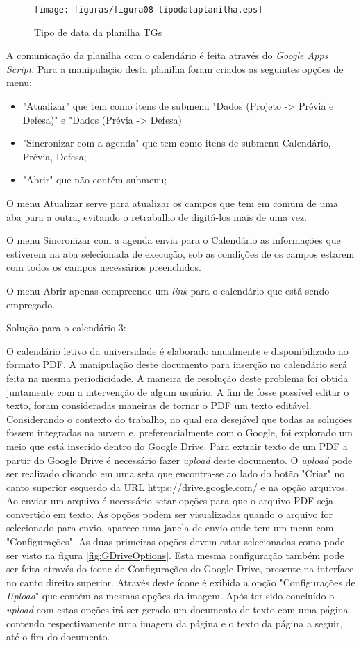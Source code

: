 \begin{figure}[hbtn]
   \centering
   \texttt{[image: figuras/figura08-tipodataplanilha.eps]}
   \caption{Tipo de data da planilha TGs}
   \label{fig:PlanilhaData}
\end{figure} 

A comunicação da planilha com o calendário é feita através do \emph{Google Apps Script}. Para a manipulação desta planilha foram criados as seguintes opções de menu: 

\begin{itemize}
\item "Atualizar" que tem como itens de submenu "Dados (Projeto -> Prévia e Defesa)" e "Dados (Prévia -> Defesa)
\item "Sincronizar com a agenda" que tem como itens de submenu Calendário, Prévia, Defesa;
\item "Abrir" que não contém submenu;
\end{itemize}

O menu Atualizar serve para atualizar os campos que tem em comum de uma aba para a outra, evitando o retrabalho de digitá-los mais de uma vez.

O menu Sincronizar com a agenda envia para o Calendário as informações que estiverem na aba selecionada de execução, sob as condições de os campos estarem com todos os campos necessários preenchidos.

O menu Abrir apenas compreende um \emph{link} para o calendário que está sendo empregado.

Solução para o calendário 3:

O calendário letivo da universidade é elaborado anualmente e disponibilizado no formato PDF.  A manipulação deste documento para inserção no calendário será feita na mesma periodicidade. A maneira de resolução deste problema foi obtida juntamente com a intervenção de algum usuário. A fim de fosse possível editar o texto, foram consideradas maneiras de tornar o PDF um texto editável. Considerando o contexto do trabalho, no qual era desejável que todas as soluções fossem integradas na nuvem e, preferencialmente com o Google, foi explorado um meio que está inserido dentro do Google Drive. Para extrair texto de um PDF a partir do Google Drive é necessário fazer \emph{upload} deste documento. O \emph{upload} pode ser realizado clicando em uma seta que encontra-se ao lado do botão "Criar" no canto superior esquerdo da URL https://drive.google.com/ e na opção arquivos. Ao enviar um arquivo é necessário setar opções para que o arquivo PDF seja convertido em texto. As opções podem ser visualizadas quando o arquivo for selecionado para envio, aparece uma janela de envio onde tem um menu com "Configurações". As duas primeiras opções devem estar selecionadas como pode ser visto na figura \ref{fig:GDriveOptions}. Esta mesma configuração também pode ser feita através do ícone de Configurações do Google Drive, presente na interface no canto direito superior. Através deste ícone é exibida a opção "Configurações de \emph{Upload}" que contém as mesmas opções da imagem. Após ter sido concluído o \emph{upload} com estas opções irá ser gerado um documento de texto com uma página contendo respectivamente uma imagem da página e o texto da página a seguir, até o fim do documento.

